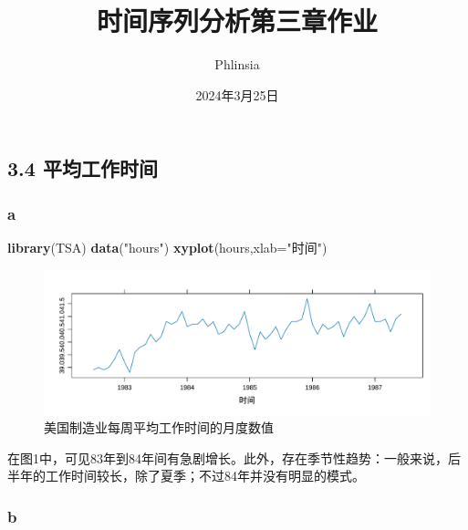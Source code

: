 \documentclass[
]{article}
\title{时间序列分析第三章作业}
\author{Phlinsia}
\date{2024年3月25日}
\newenvironment{Shaded}{\begin{snugshade}}{\end{snugshade}}
\newcommand{\AttributeTok}[1]{\textcolor[rgb]{0.13,0.29,0.53}{#1}}
\newcommand{\FunctionTok}[1]{\textcolor[rgb]{0.13,0.29,0.53}{\textbf{#1}}}
\newcommand{\NormalTok}[1]{#1}
\newcommand{\StringTok}[1]{\textcolor[rgb]{0.31,0.60,0.02}{#1}}
\begin{document}
\maketitle

{
\setcounter{tocdepth}{2}
\tableofcontents
}
\hypertarget{ux5e73ux5747ux5de5ux4f5cux65f6ux95f4}{%
\subsection{3.4 平均工作时间}\label{ux5e73ux5747ux5de5ux4f5cux65f6ux95f4}}

\hypertarget{a}{%
\subsubsection*{a}\label{a}}

\begin{Shaded}
\begin{Highlighting}[]
\FunctionTok{library}\NormalTok{(TSA)}
\FunctionTok{data}\NormalTok{(}\StringTok{"hours"}\NormalTok{)}
\FunctionTok{xyplot}\NormalTok{(hours,}\AttributeTok{xlab=}\StringTok{"时间"}\NormalTok{)}
\end{Highlighting}
\end{Shaded}

\begin{figure}
\centering
\includegraphics{chapter3_files/figure-latex/unnamed-chunk-1-1.pdf}
\caption{\label{fig:unnamed-chunk-1}美国制造业每周平均工作时间的月度数值}
\end{figure}

在图1中，可见83年到84年间有急剧增长。此外，存在季节性趋势：一般来说，后半年的工作时间较长，除了夏季；不过84年并没有明显的模式。

\hypertarget{b}{%
\subsubsection*{b}\label{b}}
\end{document}
